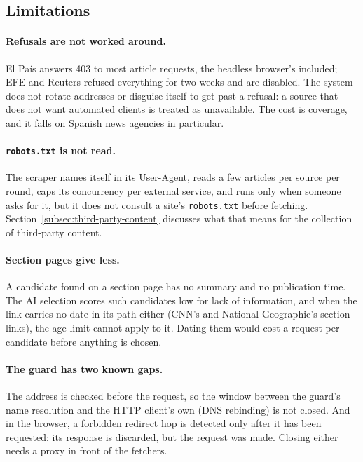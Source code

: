 
\subsection{Limitations}
\label{subsec:scraping-limitations}

\paragraph{Refusals are not worked around.} El País answers 403 to
most article requests, the headless browser's included; EFE and Reuters
refused everything for two weeks and are disabled. The system does not
rotate addresses or disguise itself to get past a refusal: a source
that does not want automated clients is treated as unavailable. The
cost is coverage, and it falls on Spanish news agencies in particular.

\paragraph{\texttt{robots.txt} is not read.} The scraper names itself
in its User-Agent, reads a few articles per source per round, caps its
concurrency per external service, and runs only when someone asks for
it, but it does not consult a site's \texttt{robots.txt} before
fetching. Section~\ref{subsec:third-party-content} discusses what that
means for the collection of third-party content.

\paragraph{Section pages give less.} A candidate found on a section
page has no summary and no publication time. The AI selection scores
such candidates low for lack of information, and when the link carries
no date in its path either (CNN's and National Geographic's section
links), the age limit cannot apply to it. Dating them would cost a
request per candidate before anything is chosen.

\paragraph{The guard has two known gaps.} The address is checked
before the request, so the window between the guard's name resolution
and the HTTP client's own (DNS rebinding) is not closed. And in the
browser, a forbidden redirect hop is detected only after it has been
requested: its response is discarded, but the request was made.
Closing either needs a proxy in front of the fetchers.

